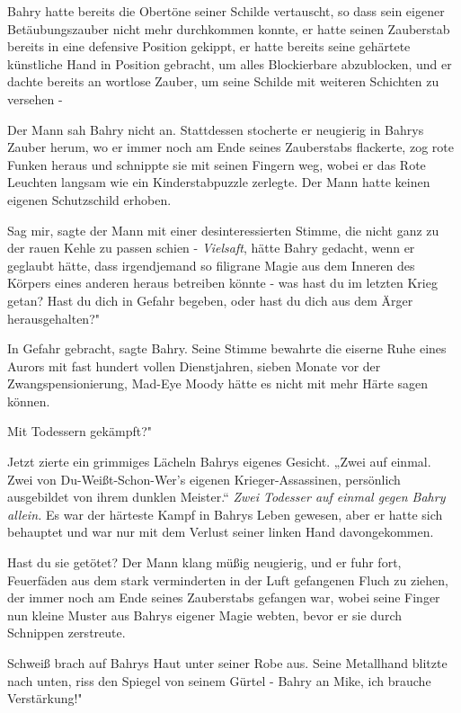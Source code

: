 Bahry hatte bereits die Obertöne seiner Schilde vertauscht, so dass sein eigener
Betäubungszauber nicht mehr durchkommen konnte, er hatte seinen Zauberstab
bereits in eine defensive Position gekippt, er hatte bereits seine gehärtete
künstliche Hand in Position gebracht, um alles Blockierbare abzublocken, und er
dachte bereits an wortlose Zauber, um seine Schilde mit weiteren Schichten zu
versehen -

Der Mann sah Bahry nicht an. Stattdessen stocherte er neugierig in Bahrys Zauber
herum, wo er immer noch am Ende seines Zauberstabs flackerte, zog rote Funken
heraus und schnippte sie mit seinen Fingern weg, wobei er das Rote Leuchten
langsam wie ein Kinderstabpuzzle zerlegte. Der Mann hatte keinen eigenen
Schutzschild erhoben.

\glqq Sag mir\grqq{}, sagte der Mann mit einer desinteressierten Stimme, die
nicht ganz zu der rauen Kehle zu passen schien - \emph{Vielsaft}, hätte Bahry
gedacht, wenn er geglaubt hätte, dass irgendjemand so filigrane Magie aus dem
Inneren des Körpers eines anderen heraus betreiben könnte - \glqq was hast du im
letzten Krieg getan? Hast du dich in Gefahr begeben, oder hast du dich aus dem
Ärger herausgehalten?"

\glqq In Gefahr gebracht\grqq{}, sagte Bahry. Seine Stimme bewahrte die eiserne
Ruhe eines Aurors mit fast hundert vollen Dienstjahren, sieben Monate vor der
Zwangspensionierung, Mad-Eye Moody hätte es nicht mit mehr Härte sagen können.

\glqq Mit Todessern gekämpft?"

Jetzt zierte ein grimmiges Lächeln Bahrys eigenes Gesicht. „Zwei auf einmal.
Zwei von Du-Weißt-Schon-Wer's eigenen Krieger-Assassinen, persönlich ausgebildet
von ihrem dunklen Meister.“
\emph{Zwei Todesser auf einmal gegen Bahry allein.}
Es war der härteste Kampf in Bahrys Leben gewesen, aber er hatte sich behauptet
und war nur mit dem Verlust seiner linken Hand davongekommen.

\glqq Hast du sie getötet?\grqq{} Der Mann klang müßig neugierig, und er fuhr
fort, Feuerfäden aus dem stark verminderten in der Luft gefangenen Fluch zu
ziehen, der immer noch am Ende seines Zauberstabs gefangen war, wobei seine
Finger nun kleine Muster aus Bahrys eigener Magie webten, bevor er sie durch
Schnippen zerstreute.

Schweiß brach auf Bahrys Haut unter seiner Robe aus. Seine Metallhand blitzte
nach unten, riss den Spiegel von seinem Gürtel - \glqq Bahry an Mike, ich
brauche Verstärkung!"

